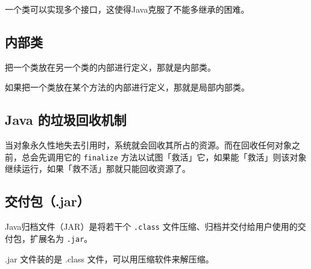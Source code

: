 \documentclass[UTF8]{ctexart}
\begin{document}
一个类可以实现多个接口，这使得Java克服了不能多继承的困难。

\subsection{内部类}
把一个类放在另一个类的内部进行定义，那就是内部类。

如果把一个类放在某个方法的内部进行定义，那就是局部内部类。

\subsection{Java 的垃圾回收机制}
当对象永久性地失去引用时，系统就会回收其所占的资源。而在回收任何对象之前，总会先调用它的 \verb!finalize! 方法以试图「救活」它，如果能「救活」则该对象继续运行，如果「救不活」那就只能回收资源了。

\newpage
{}
\BgThispage
\subsection{交付包（.jar）}
Java归档文件（JAR）是将若干个 \verb!.class! 文件压缩、归档并交付给用户使用的交付包，扩展名为 \verb!.jar!。

.jar 文件装的是 .class 文件，可以用压缩软件来解压缩。
\end{document}
